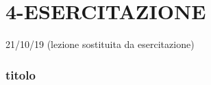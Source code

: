\section*{4-ESERCITAZIONE}
21/10/19 (lezione sostituita da esercitazione)
\subsubsection*{titolo}

\newpage